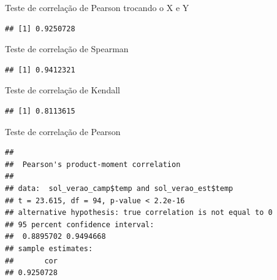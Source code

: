 \documentclass[
]{book}
\newenvironment{Shaded}{\begin{snugshade}}{\end{snugshade}}
\newcommand{\DataTypeTok}[1]{\textcolor[rgb]{0.13,0.29,0.53}{#1}}
\newcommand{\KeywordTok}[1]{\textcolor[rgb]{0.13,0.29,0.53}{\textbf{#1}}}
\newcommand{\NormalTok}[1]{#1}
\newcommand{\OperatorTok}[1]{\textcolor[rgb]{0.81,0.36,0.00}{\textbf{#1}}}
\newcommand{\StringTok}[1]{\textcolor[rgb]{0.31,0.60,0.02}{#1}}
\begin{document}
Teste de correlação de Pearson trocando o X e Y

\begin{Shaded}
\end{Shaded}

\begin{verbatim}
## [1] 0.9250728
\end{verbatim}

Teste de correlação de Spearman

\begin{Shaded}
\end{Shaded}

\begin{verbatim}
## [1] 0.9412321
\end{verbatim}

Teste de correlação de Kendall

\begin{Shaded}
\end{Shaded}

\begin{verbatim}
## [1] 0.8113615
\end{verbatim}

Teste de correlação de Pearson

\begin{Shaded}
\end{Shaded}

\begin{verbatim}
## 
##  Pearson's product-moment correlation
## 
## data:  sol_verao_camp$temp and sol_verao_est$temp
## t = 23.615, df = 94, p-value < 2.2e-16
## alternative hypothesis: true correlation is not equal to 0
## 95 percent confidence interval:
##  0.8895702 0.9494668
## sample estimates:
##       cor 
## 0.9250728
\end{verbatim}
\end{document}
